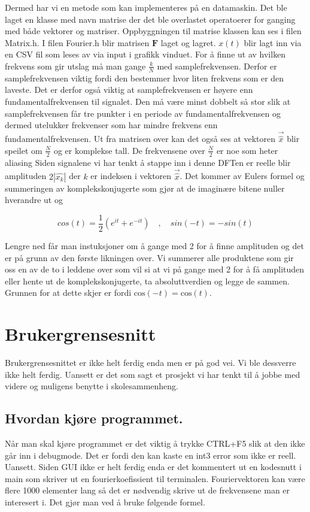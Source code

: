 \documentclass{article}
\begin{document}
        Dermed har vi en metode som kan implementeres på en datamaskin. Det ble laget en klasse med navn matrise der det ble overlastet operatoerer for ganging med både vektorer og matriser.
        Oppbyggningen til matrise klassen kan ses i filen Matrix.h. I filen Fourier.h blir matrisen \(\boldsymbol{F}\) laget og lagret.
        \(x(t)\) blir lagt inn via en CSV fil som leses av via input i grafikk vinduet. For å finne ut av hvilken frekvens som gir utslag må man gange \(\frac{k}{N}\) med samplefrekvensen.
        Derfor er samplefrekvensen viktig fordi den bestemmer hvor liten frekvens som er den laveste.
        Det er derfor også viktig at samplefrekvensen er høyere enn fundamentalfrekvensen til signalet.
        Den må være minst dobbelt så stor slik at samplefrekvensen får tre punkter i en periode av fundamentalfrekvensen og dermed utelukker frekvenser som har mindre frekvens enn fundamentalfrekvensen.
        Ut fra matrisen over kan det også ses at vektoren \(\vec{\hat{x}}\) blir speilet om \(\frac{N}{2}\) og er komplekse tall.
        De frekvensene over \(\frac{N}{2}\) er noe som heter aliasing 
        Siden signalene vi har tenkt å stappe inn i denne DFTen er reelle blir amplituden \(2|\hat{x_k}|\) der \(k\) er indeksen i vektoren \(\vec{\hat{x}}\). 
        Det kommer av Eulers formel og summeringen av komplekskonjugerte som gjør at de imaginære bitene nuller hverandre ut og 

        \[
            cos(t) = \frac{1}{2}\left(e^{it} + e^{-it}\right) \quad , \quad sin(-t) = -sin(t)
        \]

        Lengre ned får man instuksjoner om å gange med 2 for å finne amplituden og det er på grunn av den første likningen over. 
        Vi summerer alle produktene som gir oss en av de to i leddene over som vil si at vi på gange med 2 for å få amplituden eller hente ut de komplekskonjugerte, ta absoluttverdien og legge de sammen.
        Grunnen for at dette skjer er fordi \(\text{cos}(-t) = \text{cos}(t)\). 
    
    \section{Brukergrensesnitt}
        Brukergrensesnittet er ikke helt ferdig enda men er på god vei. Vi ble dessverre ikke helt ferdig.
        Uansett er det som sagt et prosjekt vi har tenkt til å jobbe med videre og muligens benytte i skolesammenheng.

        \subsection{Hvordan kjøre programmet.}
            Når man skal kjøre programmet er det viktig å trykke CTRL+F5 slik at den ikke går inn i debugmode. 
            Det er fordi den kan kaste en int3 error som ikke er reell. 
            Uansett. 
            Siden GUI ikke er helt ferdig enda er det kommentert ut en kodesnutt i main som skriver ut en fourierkoefissient til terminalen.
            Fouriervektoren kan være flere 1000 elementer lang så det er nødvendig skrive ut de frekvensene man er interesert i. 
            Det gjør man ved å bruke følgende formel.
            
\end{document}
